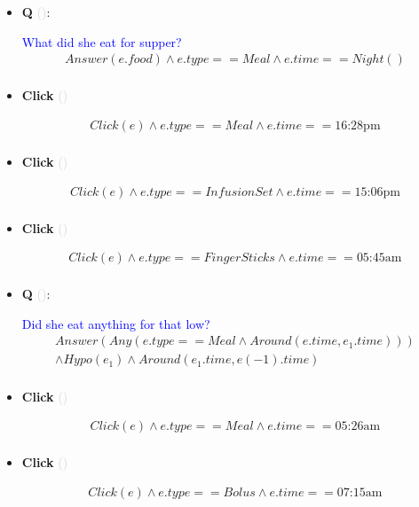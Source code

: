 \documentclass[11pt]{article}
\newcounter{CQ}
\newcounter{CClick}
\newcommand{\key}[1]{\textcolor{lightgray}{#1}}
\begin{document}
\begin{itemize}
	\item
	\textbf{Q\theCQ} \key{()}: \addtocounter{CQ}{1}
	\textcolor{blue}{ What did she eat for supper? }
	\begin{multline*}
	Answer(e.food) \wedge e.type == Meal \wedge e.time==Night()  \\
	\end{multline*}
	
	
	\item
	\textbf{Click\theCClick} \key{()} \addtocounter{CClick}{1}
	\begin{multline*}
	Click(e) \wedge e.type == Meal \wedge e.time == \mbox{16:28pm} \\
	\end{multline*}
	

	\item
	\textbf{Click\theCClick} \key{()} \addtocounter{CClick}{1}
	\begin{multline*}
	Click(e) \wedge e.type == InfusionSet \wedge e.time == \mbox{15:06pm} \\
	\end{multline*}
	
	
	\item
	\textbf{Click\theCClick} \key{()} \addtocounter{CClick}{1}
	\begin{multline*}
	Click(e) \wedge e.type == FingerSticks \wedge e.time == \mbox{05:45am} \\
	\end{multline*}
	
	
	\item
	\textbf{Q\theCQ} \key{()}: \addtocounter{CQ}{1}
	\textcolor{blue}{ Did she eat anything for that low? }
	\begin{multline*}
	Answer(Any(e.type==Meal \wedge Around(e.time, e_1.time))) \\
	\wedge Hypo(e_1) \wedge Around(e_1.time, e(-1).time) \\
	\end{multline*}
	
	
	\item
	\textbf{Click\theCClick} \key{()} \addtocounter{CClick}{1}
	\begin{multline*}
	Click(e) \wedge e.type == Meal \wedge e.time == \mbox{05:26am} \\
	\end{multline*}
	
	
	\item
	\textbf{Click\theCClick} \key{()} \addtocounter{CClick}{1}
	\begin{multline*}
	Click(e) \wedge e.type == Bolus \wedge e.time == \mbox{07:15am} \\
	\end{multline*}
	


\end{itemize}
\end{document}
